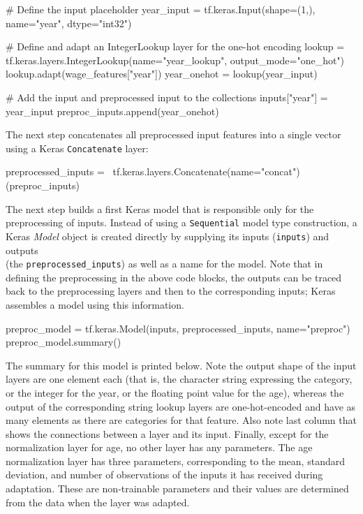 \begin{pythoncode}
# Define the input placeholder
year_input = tf.keras.Input(shape=(1,), name="year", dtype="int32")

# Define and adapt an IntegerLookup layer for the one-hot encoding
lookup = tf.keras.layers.IntegerLookup(name="year_lookup",
                                       output_mode="one_hot")
lookup.adapt(wage_features["year"])
year_onehot = lookup(year_input)

# Add the input and preprocessed input to the collections
inputs["year"] = year_input
preproc_inputs.append(year_onehot)
\end{pythoncode}

The next step concatenates all preprocessed input features into a single vector using a Keras \texttt{Concatenate} layer:

\begin{pythoncode}
preprocessed_inputs = \
    tf.keras.layers.Concatenate(name="concat")(preproc_inputs)
\end{pythoncode}

The next step builds a first Keras model that is responsible only for the preprocessing of inputs. Instead of using a \texttt{Sequential} model type construction, a Keras \emph{Model} object is created directly by supplying its inputs (\texttt{inputs}) and outputs \\(the \texttt{preprocessed\_inputs}) as well as a name for the model. Note that in defining the preprocessing in the above code blocks, the outputs can be traced back to the preprocessing layers and then to the corresponding inputs; Keras assembles a model using this information.

\begin{pythoncode}
preproc_model = tf.keras.Model(inputs, 
                               preprocessed_inputs,
                               name="preproc")
preproc_model.summary()
\end{pythoncode}

The summary for this model is printed below. Note the output shape of the input layers are one element each (that is, the character string expressing the category, or the integer for the year, or the floating point value for the age), whereas the output of the corresponding string lookup layers are one-hot-encoded and have as many elements as there are categories for that feature. Also note last column that shows the connections between a layer and its input. Finally, except for the normalization layer for age, no other layer has any parameters. The age normalization layer has three parameters, corresponding to the mean, standard deviation, and number of observations of the inputs it has received during adaptation. These are non-trainable parameters and their values are determined from the data when the layer was adapted. 

